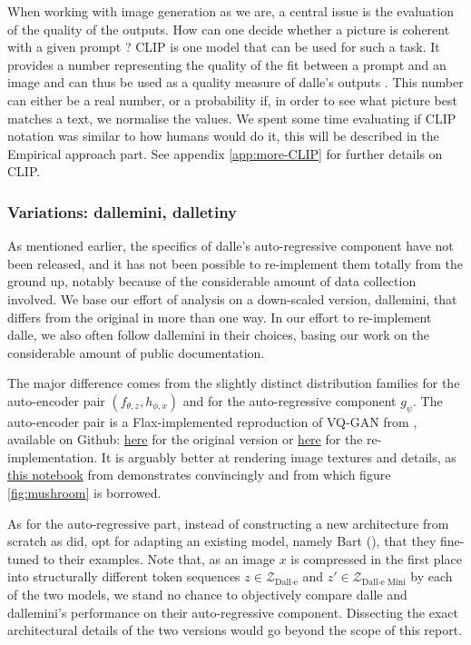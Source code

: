 \documentclass{article}
\begin{document}
\begin{multicols}{2}
When working with image generation as we are, a central issue is the evaluation of the quality of the outputs. How can one decide whether a picture is coherent with a given prompt ? CLIP is one model that can be used for such a task. It provides a number representing the quality of the fit between a prompt and an image and can thus be used as a quality measure of \gls{dalle}'s outputs \citet{learntransf, openaiclip}. This number can either be a real number, or a probability if, in order to see what picture best matches a text, we normalise the values. We spent some time evaluating if CLIP notation was similar to how humans would do it, this will be described in the Empirical approach part. See appendix \ref{app:more-CLIP} for further details on CLIP. 

\subsubsection{Variations: \gls{dallemini}, \gls{dalletiny}}

As mentioned earlier, the specifics of \gls{dalle}'s auto-regressive component have not been released, and it has not been possible to re-implement them totally from the ground up, notably because of the considerable amount of data collection involved. We base our effort of analysis on a down-scaled version, \gls{dallemini}, that differs from the original in more than one way. In our effort to re-implement \gls{dalle}, we also often follow \gls{dallemini} in their choices, basing our work on the considerable amount of public documentation.

The major difference comes from the slightly distinct distribution families for the auto-encoder pair $(f_{\theta,z}, h_{\phi,x})$ and for the auto-regressive component $g_\psi$. The auto-encoder pair is a Flax-implemented reproduction of VQ-GAN from \citet{tamingtransfo}, available on Github: \href{https://github.com/CompVis/taming-transformers for the original}{here} for the original version or \href{https://github.com/patil-suraj/vqgan-jax}{here} for the re-implementation. It is arguably better at rendering image textures and details, as \href{https://colab.research.google.com/github/CompVis/taming-transformers/blob/master/scripts/reconstruction_usage.ipynb}{this notebook} from \citeauthor{tamingtransfo} demonstrates convincingly and from which figure \ref{fig:mushroom} is borrowed.

As for the auto-regressive part, instead of constructing a new architecture from scratch as \citeauthor{zeroshot} did, \citeauthor{dalleminigit} opt for adapting an existing model, namely Bart (\cite{bart}), that they fine-tuned to their examples. 
Note that, as an image $x$ is compressed in the first place into structurally different token sequences $z \in \mathcal{Z}_{\text{Dall}\cdot\text{e}}$ and $z' \in \mathcal{Z}_{\text{Dall}\cdot\text{e Mini}}$ by each of the two models, we stand no chance to objectively compare \gls{dalle} and \gls{dallemini}'s performance on their auto-regressive component.
Dissecting the exact architectural details of the two versions would go beyond the scope of this report.


\end{multicols}
\end{document}
